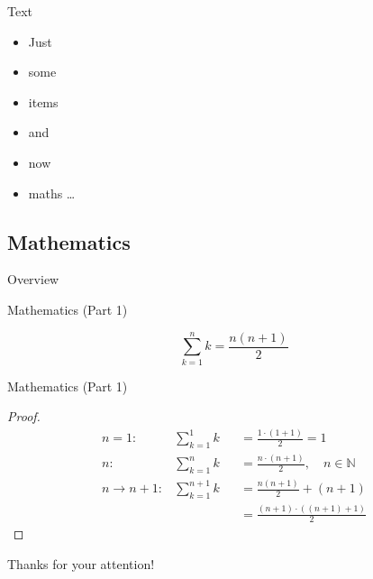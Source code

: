 \begin{frame}{Text}
	\begin{itemize}
		\item Just
		\item some
		\item items
		\item and
		\item now
		\item maths \dots
	\end{itemize}
\end{frame}


\subsection[Maths]{Mathematics}

\begin{frame}{Overview}
\tableofcontents[currentsubsection]
\end{frame}


\begin{frame}{Mathematics (Part 1)}
 	\begin{corollary}
 	\[
 	\sum_{k=1}^n k = \frac{n(n + 1)}{2}
 	\]
 	\end{corollary}
\end{frame}


\begin{frame}{Mathematics (Part 1)}
 	\begin{proof}
	 	\begin{align}
 			n = 1: & \sum_{k=1}^1 k & 					&= \frac{1 \cdot (1 + 1)}{2} = 1\\
 			n: & \sum_{k=1}^n k &  					&= \frac{n \cdot (n + 1)}{2}, \quad n \in \mathbb{N}\\
 			n \rightarrow n+1: & \sum_{k=1}^{n+1} k &   &= \frac{n(n + 1)}{2} + (n + 1)\\
 			& & 										&= \frac{(n + 1) \cdot ((n + 1) + 1)}{2}
 		\end{align}
 	\end{proof}
\end{frame}


\begin{frame}{Thanks for your attention!}
	\printbibliography
\end{frame}

